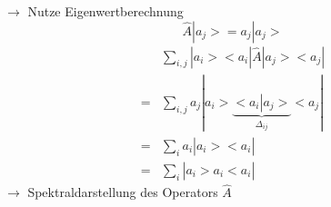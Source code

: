 \documentclass[10pt,article,colorback,accentcolor=tud9d]{scrartcl}
\begin{document}
\begin{fleqn}
\begin{itemize}
\begin{equation}
    \end{equation}
    $\rightarrow$ Nutze Eigenwertberechnung
    \begin{equation}
    \hat{A}\left.\right|a_j>=a_j\left.\right|a_j> \nonumber
    \end{equation}
    \begin{equation}
    \begin{aligned}
    &\sum_{i,j}\left.\right|a_i><a_i\left.\right|\hat{A}\left.\right|a_j><a_j\left.\right|\\
    =&\sum_{i,j}a_j\left.\right|a_i>\underbrace{<a_i\left.\right|a_j>}_{\Delta_{ij}}<a_j\left.\right|\\
    =&\sum_ia_i\left.\right|a_i><a_i\left.\right|\\
    =&\sum_i\left.\right|a_i>a_i<a_i\left.\right|
    \end{aligned}
    \end{equation}
    $\rightarrow$ Spektraldarstellung des Operators $\hat{A}$
  
\end{itemize}





\end{fleqn}
\end{document}
